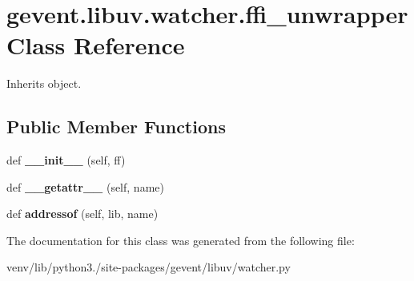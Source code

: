 \hypertarget{classgevent_1_1libuv_1_1watcher_1_1ffi__unwrapper}{}\section{gevent.\+libuv.\+watcher.\+ffi\+\_\+unwrapper Class Reference}
\label{classgevent_1_1libuv_1_1watcher_1_1ffi__unwrapper}


Inherits object.

\subsection*{Public Member Functions}
\begin{DoxyCompactItemize}
\item 
\mbox{\label{classgevent_1_1libuv_1_1watcher_1_1ffi__unwrapper_afe08717c4870ec2b0d5ed538df44cfab}} 
def {\bfseries \+\_\+\+\_\+init\+\_\+\+\_\+} (self, ff)
\item 
\mbox{\label{classgevent_1_1libuv_1_1watcher_1_1ffi__unwrapper_aaabda7822a3daecac822cc73b3f7387c}} 
def {\bfseries \+\_\+\+\_\+getattr\+\_\+\+\_\+} (self, name)
\item 
\mbox{\label{classgevent_1_1libuv_1_1watcher_1_1ffi__unwrapper_aca053ee7cef41a4edab612763d286234}} 
def {\bfseries addressof} (self, lib, name)
\end{DoxyCompactItemize}


The documentation for this class was generated from the following file\+:\begin{DoxyCompactItemize}
\item 
venv/lib/python3./site-\/packages/gevent/libuv/watcher.\+py\end{DoxyCompactItemize}
